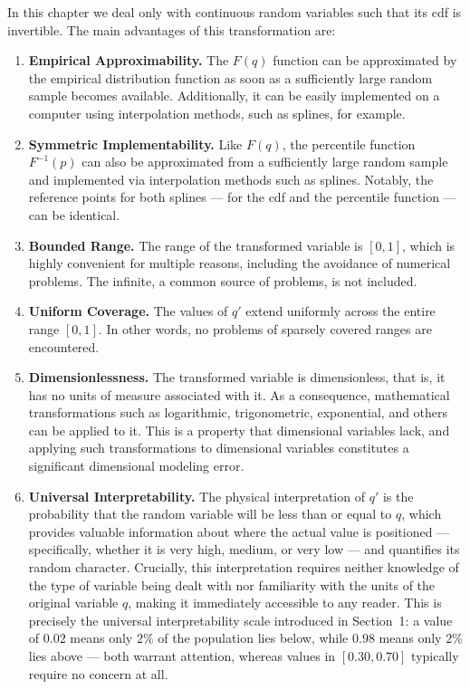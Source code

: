 In this chapter we deal only with continuous random variables such that its cdf is invertible. The main advantages of this transformation are:
\begin{enumerate}
\item \textbf{Empirical Approximability.} The $F(q)$ function can be approximated by the empirical distribution function as soon as a sufficiently large random sample becomes available. Additionally, it can be easily implemented on a computer using interpolation methods, such as splines, for example.

\item \textbf{Symmetric Implementability.} Like $F(q)$, the percentile function $F^{-1}(p)$ can also be approximated from a sufficiently large random sample and implemented via interpolation methods such as splines. Notably, the reference points for both splines — for the cdf and the percentile function — can be identical.

\item \textbf{Bounded Range.} The range of the transformed variable is $[0,1]$, which is highly convenient for multiple reasons, including the avoidance of numerical problems. The infinite, a common source of problems, is not included.

\item \textbf{Uniform Coverage.} The values of $q'$ extend uniformly across the entire range $[0,1]$. In other words, no problems of sparsely covered ranges are encountered.

\item \textbf{Dimensionlessness.} The transformed variable is dimensionless, that is, it has no units of measure associated with it. As a consequence, mathematical transformations such as logarithmic, trigonometric, exponential, and others can be applied to it. This is a property that dimensional variables lack, and applying such transformations to dimensional variables constitutes a significant dimensional modeling error.

\item \textbf{Universal Interpretability.} The physical interpretation of $q'$ is the probability that the random variable will be less than or equal to $q$, which provides valuable information about where the actual value is positioned — specifically, whether it is very high, medium, or very low — and quantifies its random character. Crucially, this interpretation requires neither knowledge of the type of variable being dealt with nor familiarity with the units of the original variable $q$, making it immediately accessible to any reader. This is precisely the universal interpretability scale introduced in Section~1: a value of $0.02$ means only $2\%$ of the population lies below, while $0.98$ means only $2\%$ lies above — both warrant attention, whereas values in $[0.30, 0.70]$ typically require no concern at all.


\end{enumerate}
